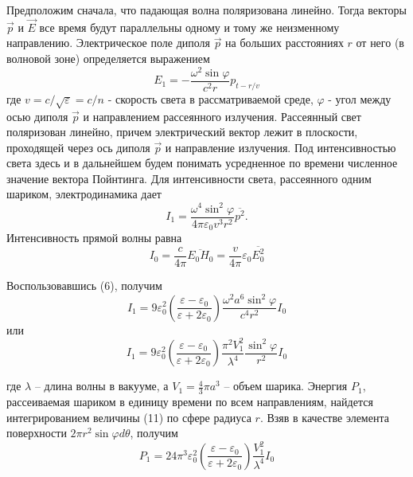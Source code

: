 \documentclass[14pt]{article}
\begin{document}
Предположим сначала, что падающая волна поляризована линейно. Тогда векторы $\vec{p}$ и $\vec{E}$ все время будут параллельны одному и тому же неизменному направлению. Электрическое поле диполя $\vec{p}$ на больших расстояниях $r$ от него (в волновой зоне) определяется выражением
\begin{equation}
	E_1 = -\frac{\omega^2\sin\varphi}{c^2r}p_{t-r/v}
\end{equation}
где $v = c/\sqrt{\varepsilon} = c/n$ - скорость света в рассматриваемой среде, $\varphi$ - угол между осью диполя $\vec{p}$ и направлением рассеянного излучения.  Рассеянный свет поляризован линейно, причем электрический вектор лежит в плоскости, проходящей через ось диполя $\vec{p}$ и направление излучения. Под интенсивностью света здесь и в дальнейшем будем понимать усредненное по времени численное значение вектора Пойнтинга. Для интенсивности света, рассеянного одним шариком, электродинамика дает
\begin{equation}
	I_1 = \frac{\omega^4\sin^2\varphi}{4\pi\varepsilon_0v^3r^2}\overline{p^2}.
\end{equation}
Интенсивность прямой волны равна
\begin{equation}
	I_0 = \frac{c}{4\pi}\overline{E_0H_0} = \frac{v}{4\pi}\varepsilon_0\overline{E_0^2}
\end{equation}

Воспользовавшись (6), получим
\begin{equation}
	I_1 = 9\varepsilon_0^2\left(\frac{\varepsilon - \varepsilon_0}{\varepsilon + 2\varepsilon_0}\right)\frac{\omega^2a^6\sin^2\varphi}{c^4r^2}I_0
\end{equation}
или
\begin{equation}
	I_1 = 9\varepsilon_0^2\left(\frac{\varepsilon - \varepsilon_0}{\varepsilon + 2\varepsilon_0}\right)\frac{\pi^2V_1^2}{\lambda^4}\frac{\sin^2\varphi}{r^2}I_0
\end{equation}

где $\lambda$ -- длина волны в вакууме, а $V_1 = \frac{4}{3}\pi a^3$ -- объем шарика. Энергия $P_1$, рассеиваемая шариком в единицу времени по всем направлениям, найдется интегрированием величины (11) по сфере радиуса $r$. Взяв в качестве элемента поверхности $2\pi r^2\sin\varphi d\theta$, получим
\begin{equation}
	P_1 = 24\pi^3\varepsilon_0^2\left(\frac{\varepsilon - \varepsilon_0}{\varepsilon + 2\varepsilon_0}\right)\frac{V_1^2}{\lambda^4}I_0
\end{equation}
\end{document}
